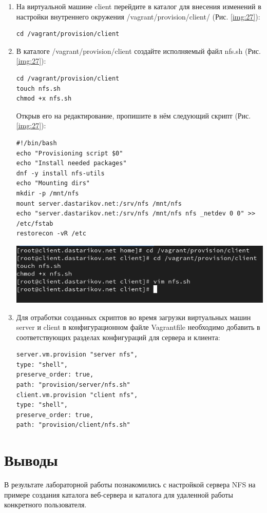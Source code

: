 \begin{enumerate}
\item На виртуальной машине client перейдите в каталог для внесения изменений в настройки внутреннего окружения /vagrant/provision/client/ (Рис. \ref{img:27}):
    \begin{verbatim}
cd /vagrant/provision/client
    \end{verbatim}
\item В каталоге /vagrant/provision/client создайте исполняемый файл nfs.sh (Рис. \ref{img:27}):
    \begin{verbatim}
cd /vagrant/provision/client
touch nfs.sh
chmod +x nfs.sh
    \end{verbatim}
Открыв его на редактирование, пропишите в нём следующий скрипт (Рис. \ref{img:27}):
    \begin{verbatim}
#!/bin/bash
echo "Provisioning script $0"
echo "Install needed packages"
dnf -y install nfs-utils
echo "Mounting dirs"
mkdir -p /mnt/nfs
mount server.dastarikov.net:/srv/nfs /mnt/nfs
echo "server.dastarikov.net:/srv/nfs /mnt/nfs nfs _netdev 0 0" >> /etc/fstab
restorecon -vR /etc
    \end{verbatim}

\begin{center}
    \centering
    \includegraphics[width=\textwidth]{../images/image27.png}
    \label{img:27}
\end{center}

\item Для отработки созданных скриптов во время загрузки виртуальных машин server и client в конфигурационном файле Vagrantfile необходимо добавить в соответствующих разделах конфигураций для сервера и клиента:
    \begin{verbatim}
server.vm.provision "server nfs",
type: "shell",
preserve_order: true,
path: "provision/server/nfs.sh"
client.vm.provision "client nfs",
type: "shell",
preserve_order: true,
path: "provision/client/nfs.sh"
    \end{verbatim}

\end{enumerate}

\section{Выводы}
В результате лабораторной работы познакомились с настройкой сервера NFS на примере создания каталога веб-сервера и каталога для удаленной работы конкретного пользователя.

